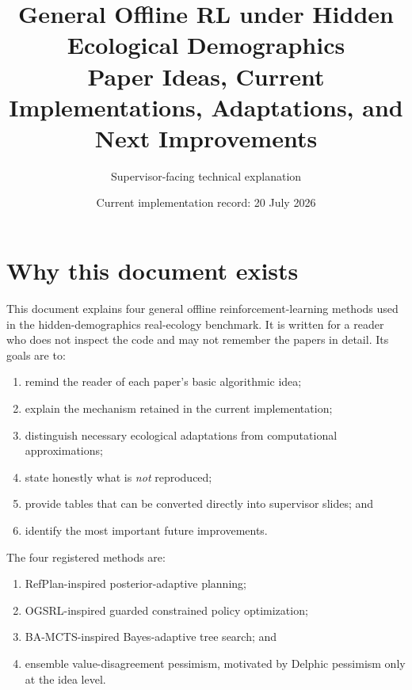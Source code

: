 \documentclass[11pt,a4paper]{article}
\title{General Offline RL under Hidden Ecological Demographics\\
Paper Ideas, Current Implementations, Adaptations, and Next Improvements}
\author{Supervisor-facing technical explanation}
\date{Current implementation record: 20 July 2026}
\begin{document}
\maketitle
\tableofcontents
\newpage

\section{Why this document exists}

This document explains four general offline reinforcement-learning methods used in the
hidden-demographics real-ecology benchmark. It is written for a reader who does not inspect the
code and may not remember the papers in detail. Its goals are to:

\begin{enumerate}[leftmargin=*]
  \item remind the reader of each paper's basic algorithmic idea;
  \item explain the mechanism retained in the current implementation;
  \item distinguish necessary ecological adaptations from computational approximations;
  \item state honestly what is \emph{not} reproduced;
  \item provide tables that can be converted directly into supervisor slides; and
  \item identify the most important future improvements.
\end{enumerate}

The four registered methods are:

\begin{enumerate}[leftmargin=*]
  \item RefPlan-inspired posterior-adaptive planning;
  \item OGSRL-inspired guarded constrained policy optimization;
  \item BA-MCTS-inspired Bayes-adaptive tree search; and
  \item ensemble value-disagreement pessimism, motivated by Delphic pessimism only at the idea
  level.
\end{enumerate}

\noindent{}
\end{document}
